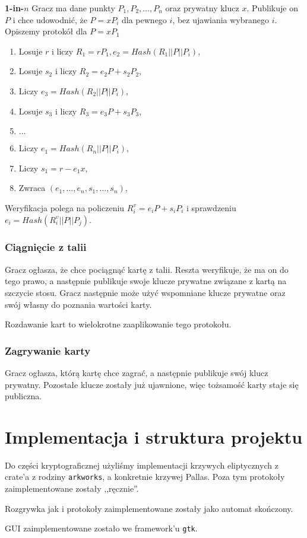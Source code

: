 \documentclass{article}
\begin{document}
\noindent \textbf{1-in-$n$} Gracz ma dane punkty $P_1,P_2,\ldots,P_n$ oraz prywatny klucz $x$. Publikuje on $P$ i chce udowodnić, że $P = xP_i$ dla pewnego $i$, bez ujawiania wybranego $i$.
\\

\noindent Opiszemy protokół dla $P = xP_1$
\noindent \begin{enumerate}
    \item Losuje $r$ i liczy $R_1 = rP_1, e_2 = Hash(R_1 || P || P_i)$,
    \item Losuje $s_2$ i liczy $R_2 = e_2P + s_2P_2$,
    \item Liczy $e_3 = Hash(R_2 || P || P_i)$,
    \item Losuje $s_3$ i liczy $R_3 = e_3P + s_3P_3$,
    \item $\ldots$
    \item Liczy $e_1 = Hash(R_n || P || P_i)$,
    \item Liczy $s_1 = r - e_1x$,
    \item Zwraca $(e_1,\ldots,e_n,s_1,\ldots,s_n)$,
\end{enumerate}

\noindent Weryfikacja polega na policzeniu $R_i^v = e_iP + s_iP_i$ i sprawdzeniu $e_i = Hash(R_i^v || P || P_j)$.

\subsubsection{Ciągnięcie z talii}

Gracz ogłasza, że chce pociągnąć kartę z talii. Reszta weryfikuje, że ma on do tego prawo, a następnie publikuje swoje klucze prywatne związane z kartą na szczycie stosu. Gracz następnie może użyć wspomniane klucze prywatne oraz swój własny do poznania wartości karty.

Rozdawanie kart to wielokrotne zaaplikowanie tego protokołu.

\subsubsection{Zagrywanie karty}

Gracz ogłasza, którą kartę chce zagrać, a następnie publikuje swój klucz prywatny. Pozostałe klucze zostały już ujawnione, więc tożsamość karty staje się publiczna.

\section{Implementacja i struktura projektu}

Do części kryptograficznej użyliśmy implementacji krzywych eliptycznych z crate'a z rodziny \texttt{arkworks}, a konkretnie krzywej Pallas. Poza tym protokoły zaimplementowane zostały ,,ręcznie''.

Rozgrywka jak i protokoły zaimplementowane zostały jako automat skończony.

GUI zaimplementowane zostało we framework'u \texttt{gtk}.
\end{document}
